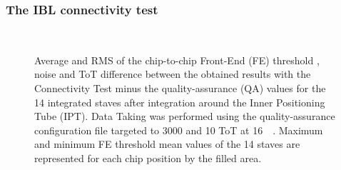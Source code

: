 \subsubsection{The IBL connectivity test}
\begin{figure}
\centering
{}
\\
 \caption{Average and RMS of the chip-to-chip Front-End (FE) threshold , noise  and ToT  difference between the obtained results with the Connectivity Test minus the quality-assurance (QA) values for the 14 integrated staves after integration around the Inner Positioning Tube (IPT). Data Taking was performed using the quality-assurance configuration file targeted to \SI{3000}{\e} and 10 ToT at \SI{16}{\kilo\e}. Maximum and minimum FE threshold mean values of the 14 staves are represented for each chip position by the filled area.}
\end{figure}

